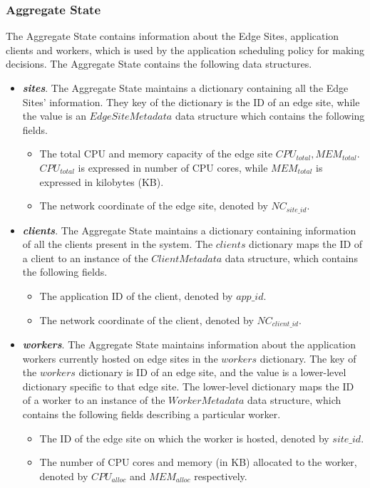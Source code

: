 \subsubsection{Aggregate State}
\label{sec:aggr_state}
The Aggregate State contains information about the Edge Sites, application clients and workers, which is used by the application scheduling policy for making decisions. The Aggregate State contains the following data structures.
\begin{itemize}
\item \textit{\textbf{sites}}. The Aggregate State maintains a dictionary containing all the Edge Sites' information. They key of the dictionary is the ID of an edge site, while the value is an $EdgeSiteMetadata$ data structure which contains the following fields.
\begin{itemize}
\item The total CPU and memory capacity of the edge site $CPU_{total}, MEM_{total}$. $CPU_{total}$ is expressed in number of CPU cores, while $MEM_{total}$ is expressed in kilobytes (KB).
\item The network coordinate of the edge site, denoted by $NC_{site\_id}$.
\end{itemize}
\item \textit{\textbf{clients}}. The Aggregate State maintains a dictionary containing information of all the clients present in the system. The $clients$ dictionary maps the ID of a client to an instance of the $ClientMetadata$ data structure, which contains the following fields.
\begin{itemize}
\item The application ID of the client, denoted by $app\_id$.
\item The network coordinate of the client, denoted by $NC_{client\_id}$.
\end{itemize}
\item \textit{\textbf{workers}}. The Aggregate State maintains information about the application workers currently hosted on edge sites in the $workers$ dictionary. The key of the $workers$ dictionary is ID of an edge site, and the value is a lower-level dictionary specific to that edge site. The lower-level dictionary maps the ID of a worker to an instance of the $WorkerMetadata$ data structure, which contains the following fields describing a particular worker.
\begin{itemize}
\item The ID of the edge site on which the worker is hosted, denoted by $site\_id$.
\item The number of CPU cores and memory (in KB) allocated to the worker, denoted by $CPU_{alloc}$ and $MEM_{alloc}$ respectively.

\end{itemize}
\end{itemize}
